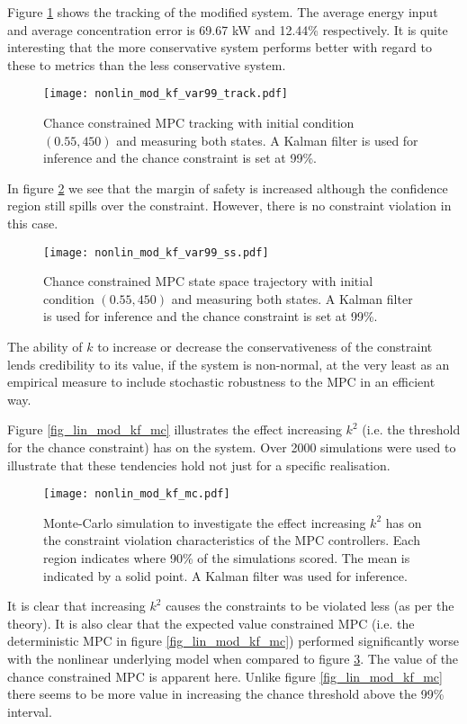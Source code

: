 Figure \ref{fig_nonlin_mod_kf_var99_track} shows the tracking of the modified system. The average energy input and average concentration error is 69.67 kW and 12.44\% respectively. It is quite interesting that the more conservative system performs better with regard to these to metrics than the less conservative system.
\begin{figure}[H] 
\centering
\texttt{[image: nonlin\_mod\_kf\_var99\_track.pdf]}
\caption{Chance constrained MPC tracking with initial condition $(0.55, 450)$ and measuring both states. A Kalman filter is used for inference and the chance constraint is set at 99\%.}
\label{fig_nonlin_mod_kf_var99_track}
\end{figure}
In figure \ref{fig_nonlin_mod_kf_var99_ss} we see that the margin of safety is increased although the confidence region still spills over the constraint. However, there is no constraint violation in this case.
\begin{figure}[H] 
\centering
\texttt{[image: nonlin\_mod\_kf\_var99\_ss.pdf]}
\caption{Chance constrained MPC state space trajectory with initial condition $(0.55, 450)$ and measuring both states. A Kalman filter is used for inference and the chance constraint is set at 99\%.}
\label{fig_nonlin_mod_kf_var99_ss}
\end{figure}
The ability of $k$ to increase or decrease the conservativeness of the constraint lends credibility to its value, if the system is non-normal, at the very least as an empirical measure to include stochastic robustness to the MPC in an efficient way.

Figure \ref{fig_lin_mod_kf_mc} illustrates the effect increasing $k^2$ (i.e. the threshold for the chance constraint) has on the system. Over 2000 simulations were used to illustrate that these tendencies hold not just for a specific realisation. 
\begin{figure}[H] 
\centering
\texttt{[image: nonlin\_mod\_kf\_mc.pdf]}
\caption{Monte-Carlo simulation to investigate the effect increasing $k^2$ has on the constraint violation characteristics of the MPC controllers. Each region indicates where 90\% of the simulations scored. The mean is indicated by a solid point. A Kalman filter was used for inference.}
\label{fig_nonlin_mod_kf_mc}
\end{figure}
It is clear that increasing $k^2$ causes the constraints to be violated less (as per the theory). It is also clear that the expected value constrained MPC (i.e. the deterministic MPC in figure \ref{fig_lin_mod_kf_mc}) performed significantly worse with the nonlinear underlying model when compared to figure \ref{fig_nonlin_mod_kf_mc}. The value of the chance constrained MPC is apparent here. Unlike figure \ref{fig_lin_mod_kf_mc} there seems to be more value in increasing the chance threshold above the 99\% interval.

